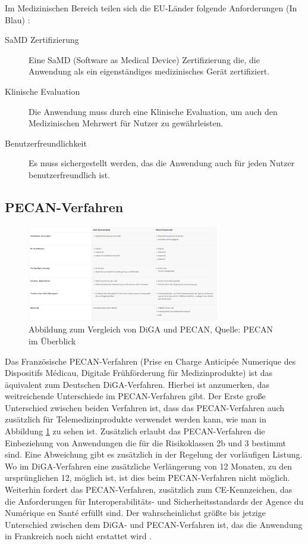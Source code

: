 \documentclass{article}
\begin{document}
		Im Medizinischen Bereich teilen sich die EU-Länder folgende Anforderungen (In Blau) \cite{dtx-regulatory-frameworks}:
		\begin{description}
			\item[SaMD Zertifizierung] Eine SaMD (Software as Medical Device) Zertifizierung die, die Anwendung als ein eigenständiges medizinisches Gerät zertifiziert.
			\item[Klinische Evaluation] Die Anwendung muss durch eine Klinische Evaluation, um auch den Medizinischen Mehrwert für Nutzer zu gewährleisten.
			\item[Benutzerfreundlichkeit] Es muss sichergestellt werden, das die Anwendung auch für jeden Nutzer benutzerfreundlich ist.
		\end{description}
		\newpage  
		\subsection{PECAN-Verfahren}
			\begin{figure}[htbp]
				\centering
				\includegraphics[width=0.75\textwidth]{./grafiken/abbildung-diga-versus-pecan}
				\caption[DiGA vs. PECAN]{Abbildung zum Vergleich von DiGA und PECAN, Quelle: PECAN im Überblick \cite{PECAN-Verfahren}}
				\label{Abb-diga-vs-pecan}
			\end{figure}
			Das Französische PECAN-Verfahren (Prise en Charge Anticipée Numerique des Dispositifs Médicau, Digitale Frühförderung für Medizinprodukte) ist das äquivalent zum Deutschen DiGA-Verfahren. Hierbei ist anzumerken, das weitreichende Unterschiede im PECAN-Verfahren gibt. Der Erste große Unterschied zwischen beiden Verfahren ist, dass das PECAN-Verfahren auch zusätzlich für Telemedizinprodukte verwendet werden kann, wie man in Abbildung \ref{Abb-diga-vs-pecan} zu sehen ist. Zusätzlich erlaubt das PECAN-Verfahren die Einbeziehung von Anwendungen die für die Risikoklassen 2b und 3 bestimmt sind. Eine Abweichung gibt es zusätzlich in der Regelung der vorläufigen Listung. Wo im DiGA-Verfahren eine zusätzliche Verlängerung von 12 Monaten, zu den ursprünglichen 12, möglich ist, ist dies beim PECAN-Verfahren nicht möglich. Weiterhin fordert das PECAN-Verfahren, zusätzlich zum CE-Kennzeichen, das die Anforderungen für Interoperabilitäts- und Sicherheitsstandards der Agence du Numérique en Santé erfüllt sind. Der wahrscheinlichst größte bis jetzige Unterschied zwischen dem DiGA- und PECAN-Verfahren ist, das die Anwendung in Frankreich noch nicht erstattet wird \cite{PECAN-Verfahren}.
\end{document}
